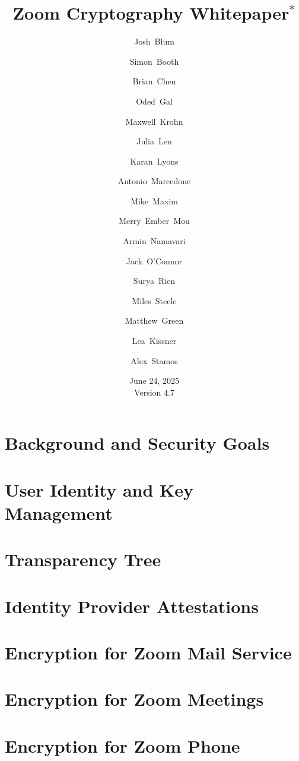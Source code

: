 \documentclass[11pt]{article}
\title{Zoom Cryptography Whitepaper$^*$}
\author[1]{\small Josh~Blum}
\author[1]{\small Simon~Booth}
\author[1]{\small Brian~Chen}
\author[1]{\small Oded~Gal}
\author[1]{\small Maxwell~Krohn}
\author[1]{\small Julia~Len}
\author[1]{\small Karan~Lyons}
\author[1]{\small Antonio~Marcedone}
\author[1]{\small Mike~Maxim}
\author[1]{\small Merry~Ember~Mou}
\author[1]{\small Armin~Namavari}
\author[1]{\small Jack~O'Connor}
\author[1]{\small Surya~Rien}
\author[1]{\small Miles~Steele}
\author[2]{\small Matthew~Green}
\author[  \hspace{-1ex}]{\small Lea~Kissner}
\author[3]{\small Alex~Stamos}
\affil[1]{\footnotesize Zoom~Video~Communications}
\affil[2]{\footnotesize Johns~Hopkins~University}
\affil[3]{\footnotesize Stanford~University}
\date{June 24, 2025 \\ \small Version 4.7}
\begin{document}
    \null  %
    \nointerlineskip  %
    \vfill
    \let\snewpage \newpage
    \let\newpage \relax
    \maketitle
    \thispagestyle{titlepage}
    \let \newpage \snewpage
    \vfill
    \break %

    \tableofcontents
    \newpage
    \renewcommand{\thesection}{\arabic{section}}
    \renewcommand{\thesubsection}{\thesection.\arabic{subsection}}
    

    \section{Background and Security Goals}\label{sec:background_and_goals}
    
    \section{User Identity and Key Management}
    
    \section{Transparency Tree}\label{sec:ztt}
    
    \section{Identity Provider Attestations}\label{sec:idpattestations}
    

    \section{Encryption for Zoom Mail Service}\label{sec:email}
    
    \section{Encryption for Zoom Meetings}\label{sec:meetings}
    
    \section{Encryption for Zoom Phone}\label{sec:phone}
    
    
    \pagebreak
    
    \newpage
    \appendix
    
    
    
\end{document}
